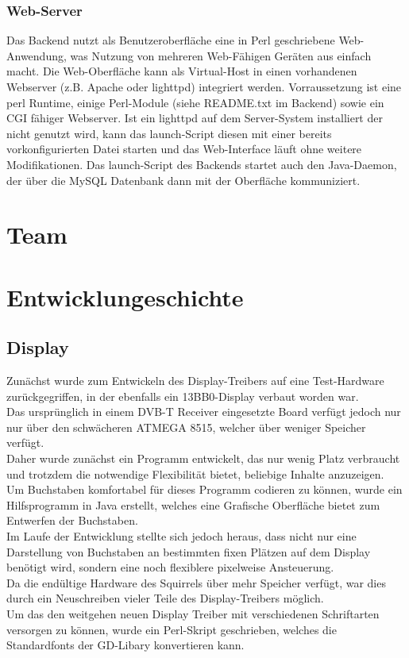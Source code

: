 \documentclass[12pt,a4paper]{article}
\begin{document}
\subsubsection{Web-Server}
Das Backend nutzt als Benutzeroberfläche eine in Perl geschriebene Web-Anwendung, was Nutzung von mehreren Web-Fähigen Geräten aus einfach macht. Die Web-Oberfläche kann als Virtual-Host in einen vorhandenen Webserver (z.B. Apache oder lighttpd) integriert werden. Vorraussetzung ist eine perl Runtime, einige Perl-Module (siehe README.txt im Backend) sowie ein CGI fähiger Webserver. Ist ein lighttpd auf dem Server-System installiert der nicht genutzt wird, kann das launch-Script diesen mit einer bereits vorkonfigurierten Datei starten und das Web-Interface läuft ohne weitere Modifikationen.
Das launch-Script des Backends startet auch den Java-Daemon, der über die MySQL Datenbank dann mit der Oberfläche kommuniziert.
		
\section{Team}

\section{Entwicklungeschichte}
\subsection{Display}
Zunächst wurde zum Entwickeln des Display-Treibers auf eine Test-Hardware zurückgegriffen, in der ebenfalls ein 13BB0-Display verbaut worden war.\\
Das ursprünglich in einem DVB-T Receiver eingesetzte Board verfügt jedoch nur nur über den schwächeren ATMEGA 8515, welcher über weniger Speicher verfügt.\\
Daher wurde zunächst ein Programm entwickelt, das nur wenig Platz verbraucht und trotzdem die notwendige Flexibilität bietet, beliebige Inhalte anzuzeigen.\\
Um Buchstaben komfortabel für dieses Programm codieren zu können, wurde ein Hilfsprogramm in Java erstellt, welches eine Grafische Oberfläche bietet zum Entwerfen der Buchstaben.\\
Im Laufe der Entwicklung stellte sich jedoch heraus, dass nicht nur eine Darstellung von Buchstaben an bestimmten fixen Plätzen auf dem Display benötigt wird, sondern eine noch flexiblere pixelweise Ansteuerung.\\
Da die endültige Hardware des Squirrels über mehr Speicher verfügt, war dies durch ein Neuschreiben vieler Teile des Display-Treibers möglich.\\
 Um das den weitgehen neuen Display Treiber mit verschiedenen Schriftarten versorgen zu können, wurde ein Perl-Skript geschrieben, welches die Standardfonts der GD-Libary konvertieren kann.\\
\end{document}
